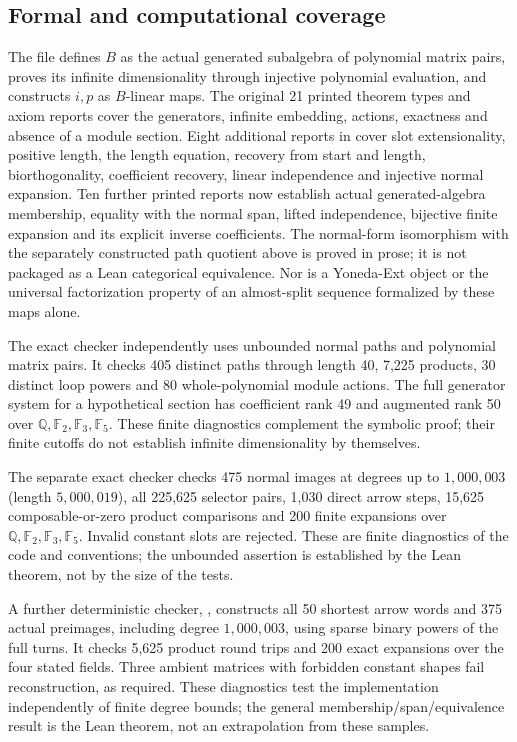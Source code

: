 \subsection{Formal and computational coverage}
The file  defines $B$ as the
actual generated subalgebra of polynomial matrix pairs, proves its
infinite dimensionality through injective polynomial evaluation, and
constructs $i,p$ as $B$-linear maps. The original 21 printed theorem types and
axiom reports cover the generators, infinite embedding, actions,
exactness and absence of a module section. Eight additional reports in
 cover slot extensionality, positive length, the length
equation, recovery from start and length, biorthogonality, coefficient
recovery, linear independence and injective normal expansion. Ten further printed reports now establish actual generated-algebra
membership, equality with the normal span, lifted independence, bijective
finite expansion and its explicit inverse coefficients. The normal-form isomorphism
with the separately constructed path quotient above is proved in prose; it is not packaged as
a Lean categorical equivalence. Nor is a Yoneda-Ext object or the
universal factorization property of an almost-split sequence formalized
by these maps alone.

The exact checker  independently
uses unbounded normal paths and polynomial matrix pairs. It checks
405 distinct paths through length 40, 7,225 products, 30 distinct loop
powers and 80 whole-polynomial module actions. The full generator system
for a hypothetical section has coefficient rank 49 and augmented rank 50
over $\mathbb Q,\mathbb F_2,\mathbb F_3,\mathbb F_5$.
These finite diagnostics complement the symbolic proof; their finite
cutoffs do not establish infinite dimensionality by themselves.


The separate exact checker 
checks 475 normal images at degrees up to $1{,}000{,}003$ (length
$5{,}000{,}019$), all 225,625 selector pairs, 1,030 direct arrow steps,
15,625 composable-or-zero product comparisons and 200 finite expansions
over $\mathbb Q,\mathbb F_2,\mathbb F_3,\mathbb F_5$. Invalid constant
slots are rejected. These are finite diagnostics of the code and
conventions; the unbounded assertion is established by the Lean theorem,
not by the size of the tests.


A further deterministic checker,
, constructs all 50 shortest
arrow words and 375 actual preimages, including degree $1{,}000{,}003$,
using sparse binary powers of the full turns. It checks 5,625 product
round trips and 200 exact expansions over the four stated fields.
Three ambient matrices with forbidden constant shapes fail reconstruction,
as required. These diagnostics test the implementation independently of
finite degree bounds; the general membership/span/equivalence result is
the Lean theorem, not an extrapolation from these samples.
